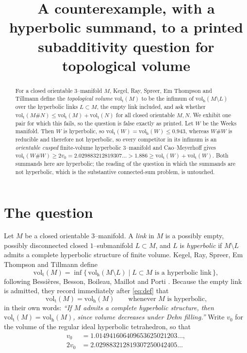 \documentclass[11pt]{amsart}
\title[A counterexample to a subadditivity question]
{A counterexample, with a hyperbolic summand, to a printed subadditivity
question for topological volume}
\date{}
\theoremstyle{definition}
\theoremstyle{remark}
\newcommand{\volt}{\operatorname{vol_t}}
\newcommand{\volh}{\operatorname{vol_h}}
\begin{document}
\begin{abstract}
For a closed orientable $3$--manifold $M$, Kegel, Ray, Spreer, Em Thompson and Tillmann
define the \emph{topological volume} $\volt(M)$ to be the infimum of $\volh(M\setminus L)$
over the hyperbolic links $L\subset M$, the empty link included, and ask whether
$\volt(M\#N)\le\volt(M)+\volt(N)$ for all closed orientable $M,N$. We exhibit one pair for
which this fails, so the question is false exactly as printed. Let $W$ be the Weeks
manifold. Then $W$ is hyperbolic, so $\volt(W)=\volh(W)\le 0.943$, whereas $W\#W$ is
reducible and therefore not hyperbolic, so every competitor in its infimum is an
\emph{orientable cusped} finite-volume hyperbolic $3$--manifold and Cao--Meyerhoff gives
$\volt(W\#W)\ge 2v_0=2.029883212819307\ldots>1.886\ge\volt(W)+\volt(W)$. Both summands here
are hyperbolic; the reading of the question in which the summands are not hyperbolic, which
is the substantive connected-sum problem, is untouched.
\end{abstract}

\maketitle

\section{The question}

Let $M$ be a closed orientable $3$--manifold. A \emph{link} in $M$ is a possibly empty,
possibly disconnected closed $1$--submanifold $L\subset M$, and $L$ is \emph{hyperbolic} if
$M\setminus L$ admits a complete hyperbolic structure of finite volume. Kegel, Ray, Spreer,
Em Thompson and Tillmann \cite{KRSTT} define
\begin{equation}\label{eq:def}
  \volt(M)=\inf\bigl\{\,\volh(M\setminus L)\;\big|\;L\subset M
  \text{ is a hyperbolic link}\,\bigr\},
\end{equation}
following Bessi\`eres, Besson, Boileau, Maillot and Porti \cite{BBBMP}. Because the empty
link is admitted, they record immediately after \eqref{eq:def} that
\begin{equation}\label{eq:hyp}
  \volt(M)=\volh(M)\qquad\text{whenever $M$ is hyperbolic,}
\end{equation}
in their own words: \emph{``If $M$ admits a complete hyperbolic structure, then
$\volt(M)=\volh(M)$, since volume decreases under Dehn filling.''}
Write $v_0$ for the volume of the regular ideal hyperbolic tetrahedron, so that
\begin{align*}
  v_0&=1.014941606409653625021203\ldots,\\
  2v_0&=2.029883212819307250042405\ldots
\end{align*}
\end{document}
